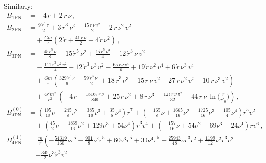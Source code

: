 \documentclass[prd,preprint,superscriptaddress,tightenlines,nofootinbib,
  eqsecnum,showpacs]{revtex4}
\begin{document}
%
Similarly:
%
\begin{subequations}\label{B}
\begin{align}
B_\text{1PN} &= -4\,\dot{r} + 2\,\dot{r}\,\nu\,,\\
B_\text{2PN} &= \frac{9\,\dot{r}^3\,\nu}{2} +
3\,\dot{r}^3\,\nu^2 -\frac{15\,\dot{r}\,\nu\,v^2}{2} -
2\,\dot{r}\,\nu^2\,v^2\nonumber\\ &\quad +
\frac{G m}{r}\left( 2\,\dot{r} + \frac{41\,\dot{r}\,\nu}{2} +
4\,\dot{r}\,\nu^2 \right)\,,\\
B_\text{3PN} &= -\frac{45\,\dot{r}^5\,\nu}{8} +
15\,\dot{r}^5\,\nu^2 + \frac{15\,\dot{r}^5\,\nu^3}{4} +
12\,\dot{r}^3\,\nu\,v^2 \nonumber\\&\quad
- \frac{111\,\dot{r}^3\,\nu^2\,v^2}{4}
-12\,\dot{r}^3\,\nu^3\,v^2 -\frac{65\,\dot{r}\,\nu\,v^4}{8} +
19\,\dot{r}\,\nu^2\,v^4 + 6\,\dot{r}\,\nu^3\,v^4
\nonumber\\&\quad + \frac{G m}{r}\left(
\frac{329\,\dot{r}^3\,\nu}{6} + \frac{59\,\dot{r}^3\,\nu^2}{2} +
18\,\dot{r}^3\,\nu^3 - 15\,\dot{r}\,\nu\,v^2 - 27\,\dot{r}\,\nu^2\,v^2
- 10\,\dot{r}\,\nu^3\,v^2 \right) \nonumber\\&\quad
+ \frac{G^2m^2}{r^2}\,\left( -4\,\dot{r} -
\frac{18169\,\dot{r}\,\nu}{840} + 25\,\dot{r}\,\nu^2 +
8\,\dot{r}\,\nu^3 - \frac{123\,\dot{r}\,\nu\,\pi^2}{32} 
+ 44\,\dot{r}\,\nu\,\ln \Big(\frac{r}{r'_0}\Big)
\right)\,,\\
B^{(0)}_\text{4PN} &= \left(\frac{105}{16} \nu
 -  \frac{245}{8} \nu^2
 + \frac{385}{16} \nu^3
 + \frac{35}{8} \nu^4\right) \dot{r}^7
 + \left(- \frac{165}{8} \nu
 + \frac{1665}{16} \nu^2
 -  \frac{1725}{16} \nu^3
 -  \frac{105}{4} \nu^4\right) \dot{r}^5 v^{2}\nonumber\\
&\quad + \left(\frac{45}{2} \nu
 -  \frac{1869}{16} \nu^2
 + 129 \nu^3
 + 54 \nu^4\right) \dot{r}^3 v^{4}
 + \left(- \frac{157}{16} \nu
 + 54 \nu^2
 - 69 \nu^3
 - 24 \nu^4\right) \dot{r} v^{6}\,,\\
B^{(1)}_\text{4PN} &= \frac{m}{r} \left(- \frac{54319}{160} \nu \dot{r}^5
 -  \frac{901}{8} \nu^2 \dot{r}^5
 + 60 \nu^3 \dot{r}^5
 + 30 \nu^4 \dot{r}^5
 + \frac{25943}{48} \nu \dot{r}^3 v^{2}
 + \frac{1199}{12} \nu^2 \dot{r}^3 v^{2} \right. \nonumber\\
&\quad \left. -  \frac{349}{2} \nu^3 \dot{r}^3 v^{2}

\end{align}
\end{subequations}
\end{document}

